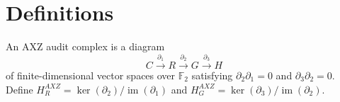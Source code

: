 \section{Definitions}
An AXZ audit complex is a diagram
\[
C \xrightarrow{\partial_1} R \xrightarrow{\partial_2} G \xrightarrow{\partial_3} H
\]
of finite-dimensional vector spaces over $\mathbb F_2$ satisfying $\partial_2\partial_1=0$ and $\partial_3\partial_2=0$. Define $H_R^{AXZ}=\ker(\partial_2)/\operatorname{im}(\partial_1)$ and $H_G^{AXZ}=\ker(\partial_3)/\operatorname{im}(\partial_2)$.
